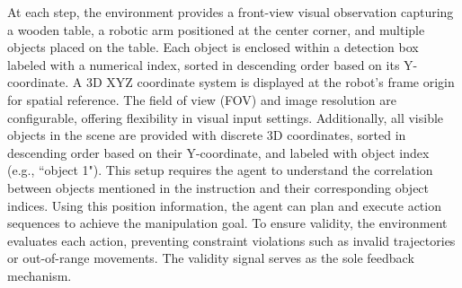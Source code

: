 
At each step, the environment provides a front-view visual observation capturing a wooden table, a robotic arm positioned at the center corner, and multiple objects placed on the table. Each object is enclosed within a detection box labeled with a numerical index, sorted in descending order based on its Y-coordinate. A 3D XYZ coordinate system is displayed at the robot’s frame origin for spatial reference. The field of view (FOV) and image resolution are configurable, offering flexibility in visual input settings. Additionally, all visible objects in the scene are provided with discrete 3D coordinates, sorted in descending order based on their Y-coordinate, and labeled with object index (e.g., ``object 1"). This setup requires the agent to understand the correlation between objects mentioned in the instruction and their corresponding object indices. Using this position information, the agent can plan and execute action sequences to achieve the manipulation goal. To ensure validity, the environment evaluates each action, preventing constraint violations such as invalid trajectories or out-of-range movements. The validity signal serves as the sole feedback mechanism.


